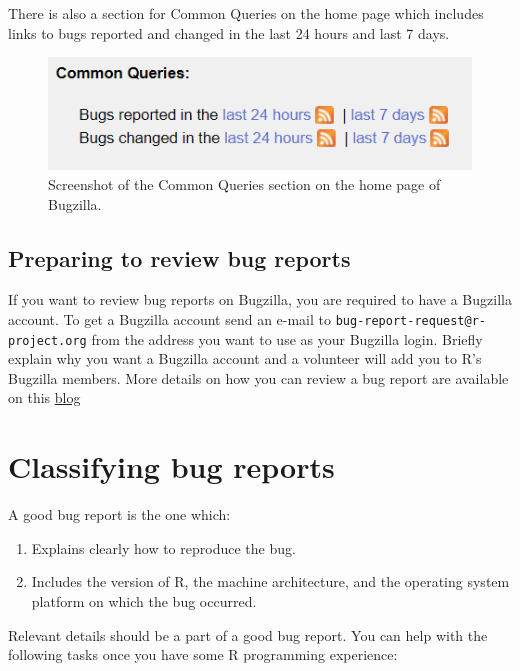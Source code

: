 \documentclass[
]{book}
\begin{document}
There is also a section for Common Queries on the home page which includes links to bugs reported and changed in the last 24 hours and last 7 days.

\begin{figure}
\centering
\includegraphics{img/commonquery.png}
\caption{Screenshot of the Common Queries section on the home page of Bugzilla.}
\end{figure}

\hypertarget{preparing-to-review-bug-reports}{%
\subsection{Preparing to review bug reports}\label{preparing-to-review-bug-reports}}

If you want to review bug reports on Bugzilla, you are required to have a Bugzilla account. To get a Bugzilla account send an e-mail to \texttt{bug-report-request@r-project.org} from the address you want to use as your Bugzilla login. Briefly explain why you want a Bugzilla account and a volunteer will add you to R's Bugzilla members. More details on how you can review a bug report are available on this \href{https://blog.r-project.org/2019/10/09/r-can-use-your-help-reviewing-bug-reports/index.html}{blog}

\hypertarget{classifying-bug-reports}{%
\section{Classifying bug reports}\label{classifying-bug-reports}}

A good bug report is the one which:

\begin{enumerate}
\def\labelenumi{\arabic{enumi}.}
\item
  Explains clearly how to reproduce the bug.
\item
  Includes the version of R, the machine architecture, and the operating system platform on which the bug occurred.
\end{enumerate}

Relevant details should be a part of a good bug report. You can help with the following tasks once you have some R programming experience:
\end{document}
